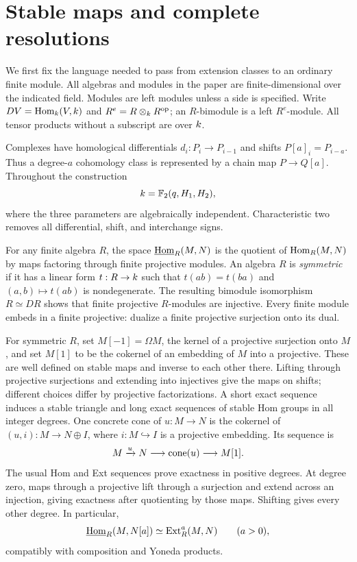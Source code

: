 \section{Stable maps and complete resolutions}\label{sec:stable}

We first fix the language needed to pass from extension classes to an
ordinary finite module. All algebras and modules in the paper are
finite-dimensional over the indicated field. Modules are left modules
unless a side is specified. Write $DV=\operatorname{Hom}_k(V,k)$ and
$R^e=R\otimes_k R^{\mathrm{op}}$; an $R$-bimodule is a left $R^e$-module.
All tensor products without a subscript are over $k$.

Complexes have homological differentials $d_i:P_i\to P_{i-1}$ and shifts
$P[a]_i=P_{i-a}$. Thus a degree-$a$ cohomology class is represented by a
chain map $P\to Q[a]$. Throughout the construction
\[
 k=\mathbb F_2(q,H_1,H_2),
\]
where the three parameters are algebraically independent. Characteristic
two removes all differential, shift, and interchange signs.

For any finite algebra $R$, the space $\underline{\operatorname{Hom}}_{R}(M,N)$ is the quotient
of $\operatorname{Hom}_R(M,N)$ by maps factoring through finite projective modules.
An algebra $R$ is \emph{symmetric} if it has a linear form $t:R\to k$
such that $t(ab)=t(ba)$ and $(a,b)\mapsto t(ab)$ is nondegenerate.
The resulting bimodule isomorphism $R\simeq DR$ shows that finite
projective $R$-modules are injective. Every finite module embeds in a
finite projective: dualize a finite projective surjection onto its dual.

For symmetric $R$, set $M[-1]=\Omega M$, the kernel of a projective
surjection onto $M$, and set $M[1]$ to be the cokernel of an embedding
of $M$ into a projective. These are well defined on stable maps and
inverse to each other there. Lifting through projective surjections and
extending into injectives give the maps on shifts; different choices
differ by projective factorizations. A short exact sequence induces a
stable triangle and long exact sequences of stable Hom groups in all
integer degrees. One concrete cone of $u:M\to N$ is the cokernel of
$(u,i):M\to N\oplus I$, where $i:M\hookrightarrow I$ is a projective
embedding. Its sequence is
\[
 M\xrightarrow{u}N\longrightarrow\operatorname{cone}(u)\longrightarrow M[1].
\]
The usual Hom and Ext sequences prove exactness in positive degrees.
At degree zero, maps through a projective lift through a surjection and
extend across an injection, giving exactness after quotienting by those
maps. Shifting gives every other degree. In particular,
\begin{equation}\label{eq:stable-ext}
 \underline{\operatorname{Hom}}_{R}(M,N[a])\simeq\operatorname{Ext}_R^a(M,N)\qquad(a>0),
\end{equation}
compatibly with composition and Yoneda products.

